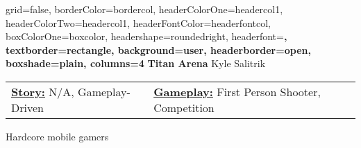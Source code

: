 \documentclass[archE1,portrait]{baposter}
\begin{document}
\background{ %

}

\begin{poster}
{
	grid=false,
	borderColor=bordercol, %
	headerColorOne=headercol1, %
	headerColorTwo=headercol1, %
	headerFontColor=headerfontcol, %
	boxColorOne=boxcolor, %
	headershape=roundedright, %
	headerfont=\Large\sf\bf, %
	textborder=rectangle,
	background=user,
	headerborder=open, %
	boxshade=plain,
	columns=4
}
{}
%
%
{
\sf\bf Titan Arena} %
{\vspace{.5em} Kyle Salitrik\\ %
} %
%




{ 
	\begin{tabularx}{\textwidth}{ X | X }
	\underline{\textbf{Story:}} N/A, Gameplay-Driven & \underline{\textbf{Gameplay:}} First Person Shooter, Competition
	\end{tabularx}
	\vspace*{-.6\baselineskip}
}


{ 
	Hardcore mobile gamers
}


\end{poster}
\end{document}

